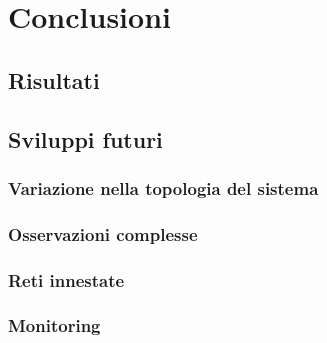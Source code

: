 \chapter{Conclusioni}
\section{Risultati}

\section{Sviluppi futuri}

\subsection{Variazione nella topologia del sistema}

\subsection{Osservazioni complesse}

\subsection{Reti innestate}

\subsection{Monitoring}